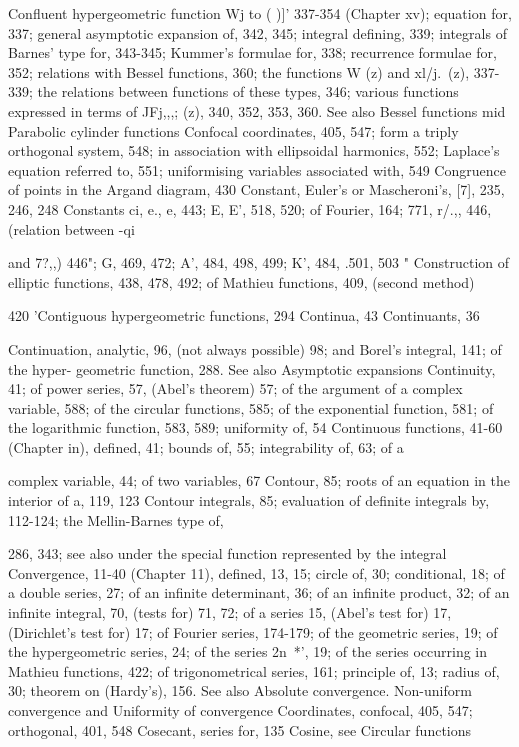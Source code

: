 Confluent hypergeometric function  Wj  to ( )]' 337-354 (Chapter xv); equation for, 337; general
asymptotic expansion of, 342, 345; integral defining, 339; integrals of Barnes' type for,
343-345; Kummer's formulae for, 338; recurrence formulae for, 352; relations with Bessel
functions, 360; the functions W    (z) and xl/j.\,  (z), 337-339; the relations between functions
of these types, 346; various functions expressed in terms of JFj,,,; (z), 340, 352, 353, 360. See
also Bessel functions mid Parabolic cylinder functions
Confocal coordinates, 405, 547; form a triply orthogonal system, 548; in association with
ellipsoidal harmonics, 552; Laplace's equation referred to, 551; uniformising variables
associated with, 549
Congruence of points in the Argand diagram, 430
Constant, Euler's or Mascheroni's, [7], 235, 246, 248
Constants ci, e., e, 443; E, E', 518, 520; of Fourier, 164; 771, r/.,, 446, (relation between -qi

and 7?,,) 446"; G, 469, 472; A', 484, 498, 499; K', 484, .501, 503 "
Construction of elliptic functions, 438, 478, 492; of Mathieu functions, 409, (second method)

420
'Contiguous hypergeometric functions, 294
Continua, 43
Continuants, 36

Continuation, analytic, 96, (not always possible) 98; and Borel's integral, 141; of the hyper-
geometric function, 288. See also Asymptotic expansions
Continuity, 41; of power series, 57, (Abel's theorem) 57; of the argument of a complex variable,
588; of the circular functions, 585; of the exponential function, 581; of the logarithmic
function, 583, 589; uniformity of, 54
Continuous functions, 41-60 (Chapter in), defined, 41; bounds of, 55; integrability of, 63; of a

complex variable, 44; of two variables, 67
Contour, 85; roots of an equation in the interior of a, 119, 123
Contour integrals, 85; evaluation of definite integrals by, 112-124; the Mellin-Barnes type of,

286, 343; see also under the special function represented by the integral
Convergence, 11-40 (Chapter 11), defined, 13, 15; circle of, 30; conditional, 18; of a double
series, 27; of an infinite determinant, 36; of an infinite product, 32; of an infinite integral,
70, (tests for) 71, 72; of a series 15, (Abel's test for) 17, (Dirichlet's test for) 17; of Fourier
series, 174-179; of the geometric series, 19; of the hypergeometric series, 24; of the series
2n~*', 19; of the series occurring in Mathieu functions, 422; of trigonometrical series, 161;
principle of, 13; radius of, 30; theorem on (Hardy's), 156. See also Absolute convergence.
Non-uniform convergence and Uniformity of convergence
Coordinates, confocal, 405, 547; orthogonal, 401, 548
Cosecant, series for, 135
Cosine, see Circular functions

